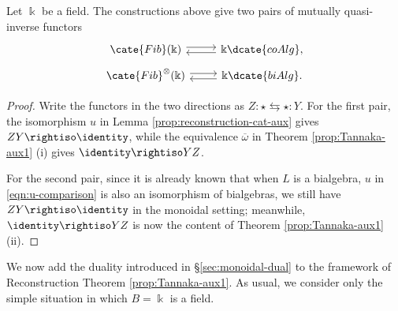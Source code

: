 \begin{theorem}\label{prop:Tannaka-reconstruction}
	Let $\Bbbk$ be a field. The constructions above give two pairs of
	mutually quasi-inverse functors
	\[\begin{tikzcd}[row sep=tiny]
		\cate{Fib}(\Bbbk) \arrow[shift left, r] & \Bbbk\dcate{coAlg}, \arrow[shift left, l] \\
		\cate{Fib}^{\otimes}(\Bbbk) \arrow[shift left, r] & \Bbbk\dcate{biAlg}. \arrow[shift left, l]
	\end{tikzcd}\]
\end{theorem}
\begin{proof}
	Write the functors in the two directions as
	$Z: \star \leftrightarrows \star :Y$. For the first pair, the isomorphism
	$u$ in Lemma \ref{prop:reconstruction-cat-aux} gives
	$ZY \rightiso \identity$, while the equivalence $\overline{\omega}$ in
	Theorem \ref{prop:Tannaka-aux1} (i) gives
	$\identity \rightiso YZ$.
	
	For the second pair, since it is already known that when $L$ is a
	bialgebra, $u$ in \eqref{eqn:u-comparison} is also an isomorphism of
	bialgebras, we still have $ZY \rightiso \identity$ in the monoidal
	setting; meanwhile, $\identity \rightiso YZ$ is now the content of
	Theorem
	\ref{prop:Tannaka-aux1} (ii).
\end{proof}

We now add the duality introduced in \S\ref{sec:monoidal-dual} to the
framework of Reconstruction Theorem \ref{prop:Tannaka-aux1}. As usual, we
consider only the simple situation in which $B = \Bbbk$ is a field.

